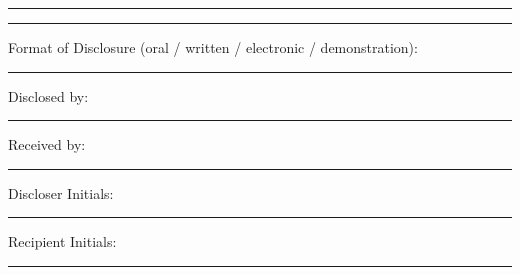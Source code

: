 \documentclass{article}
\begin{document}
\vspace{1em}
\noindent\rule{\textwidth}{0.4pt}

\vspace{1em}
\noindent\rule{\textwidth}{0.4pt}

\vspace{1.5em}
\noindent Format of Disclosure (oral / written / electronic / demonstration): \rule{5cm}{0.4pt}

\vspace{1.5em}
\noindent Disclosed by: \rule{10cm}{0.4pt}

\vspace{1.5em}
\noindent Received by: \rule{10cm}{0.4pt}

\vspace{2em}
\noindent
\begin{minipage}[t]{0.45\textwidth}
Discloser Initials: \rule{2cm}{0.4pt}
\end{minipage}
\hfill
\begin{minipage}[t]{0.45\textwidth}
Recipient Initials: \rule{2cm}{0.4pt}
\end{minipage}
\end{document}

